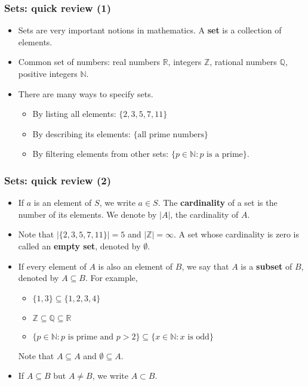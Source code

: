 \begin{frame}\frametitle{Sets: quick review (1)}
  \begin{itemize}
  \item Sets are very important notions in mathematics.  A {\bf set}
    is a collection of elements.
  \item Common set of numbers: real numbers ${\mathbb R}$, integers
    ${\mathbb Z}$, rational numbers ${\mathbb Q}$, positive integers
    ${\mathbb N}$.
  \item There are many ways to specify sets.
    \begin{itemize}
    \item By listing all elements: $\{2,3,5,7,11\}$
    \item By describing its elements: $\{ \mbox{all prime numbers} \}$
    \item By filtering elements from other sets: $\{ p\in {\mathbb N} : \mbox{$p$ is a prime}\}$.
    \end{itemize}
  \end{itemize}
\end{frame}

\begin{frame}\frametitle{Sets: quick review (2)}
  \begin{itemize}
  \item If $a$ is an element of $S$, we write $a\in S$.  The {\bf
    cardinality} of a set is the number of its elements.  We denote by
    $|A|$, the cardinality of $A$.
  \item Note that $|\{2,3,5,7,11\}|=5$ and $|{\mathbb Z}|=\infty$.  A
    set whose cardinality is zero is called an {\bf empty set},
    denoted by $\emptyset$.
  \item If every element of $A$ is also an element of $B$, we say that
    $A$ is a {\bf subset} of $B$, denoted by $A\subseteq B$.  For
    example,
    \begin{itemize}
    \item $\{1,3\}\subseteq\{1,2,3,4\}$
    \item ${\mathbb Z}\subseteq{\mathbb Q}\subseteq{\mathbb R}$
    \item $\{ p\in{\mathbb N} : \mbox{$p$ is prime and $p>2$}\}\subseteq\{ x\in{\mathbb N} : \mbox{$x$ is odd}\}$
    \end{itemize}
    Note that $A\subseteq A$ and $\emptyset\subseteq A$.
  \item If $A\subseteq B$ but $A\neq B$, we write $A\subset B$.
  \end{itemize}
\end{frame}

